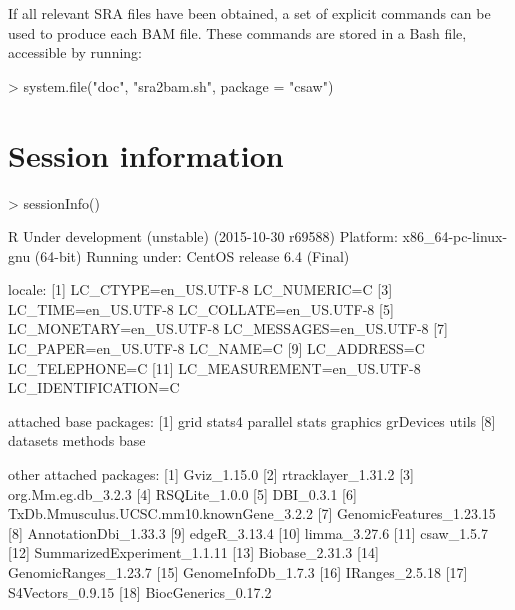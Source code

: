 \documentclass[12pt]{report}
\renewenvironment{Schunk}{\vspace{0pt}}{\vspace{0pt}}
\begin{document}
If all relevant SRA files have been obtained, a set of explicit commands can be used to produce each BAM file.
These commands are stored in a Bash file, accessible by running:

\begin{Schunk}
\begin{Sinput}
> system.file("doc", "sra2bam.sh", package = "csaw")
\end{Sinput}
\end{Schunk}

\section{Session information}
\begin{Schunk}
\begin{Sinput}
> sessionInfo()
\end{Sinput}
\begin{Soutput}
R Under development (unstable) (2015-10-30 r69588)
Platform: x86_64-pc-linux-gnu (64-bit)
Running under: CentOS release 6.4 (Final)

locale:
 [1] LC_CTYPE=en_US.UTF-8       LC_NUMERIC=C              
 [3] LC_TIME=en_US.UTF-8        LC_COLLATE=en_US.UTF-8    
 [5] LC_MONETARY=en_US.UTF-8    LC_MESSAGES=en_US.UTF-8   
 [7] LC_PAPER=en_US.UTF-8       LC_NAME=C                 
 [9] LC_ADDRESS=C               LC_TELEPHONE=C            
[11] LC_MEASUREMENT=en_US.UTF-8 LC_IDENTIFICATION=C       

attached base packages:
 [1] grid      stats4    parallel  stats     graphics  grDevices utils    
 [8] datasets  methods   base     

other attached packages:
 [1] Gviz_1.15.0                             
 [2] rtracklayer_1.31.2                      
 [3] org.Mm.eg.db_3.2.3                      
 [4] RSQLite_1.0.0                           
 [5] DBI_0.3.1                               
 [6] TxDb.Mmusculus.UCSC.mm10.knownGene_3.2.2
 [7] GenomicFeatures_1.23.15                 
 [8] AnnotationDbi_1.33.3                    
 [9] edgeR_3.13.4                            
[10] limma_3.27.6                            
[11] csaw_1.5.7                              
[12] SummarizedExperiment_1.1.11             
[13] Biobase_2.31.3                          
[14] GenomicRanges_1.23.7                    
[15] GenomeInfoDb_1.7.3                      
[16] IRanges_2.5.18                          
[17] S4Vectors_0.9.15                        
[18] BiocGenerics_0.17.2                     


\end{Soutput}
\end{Schunk}
\end{document}
